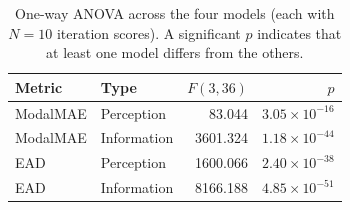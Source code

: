 \begin{table}[htbp]
\centering
\scriptsize
\setlength{\tabcolsep}{5pt}
\caption{One-way ANOVA across the four models (each with $N{=}10$ iteration scores). A significant $p$ indicates that at least one model differs from the others.}
\label{tab:anova}
\begin{tabular}{llrr}
\toprule
\textbf{Metric} & \textbf{Type} & $F(3,36)$ & $p$ \\
\midrule
ModalMAE & Perception & 83.044 & $3.05\times 10^{-16}$ \\
ModalMAE & Information & 3601.324 & $1.18\times 10^{-44}$ \\
EAD & Perception & 1600.066 & $2.40\times 10^{-38}$ \\
EAD & Information & 8166.188 & $4.85\times 10^{-51}$ \\
\bottomrule
\end{tabular}
\end{table}
